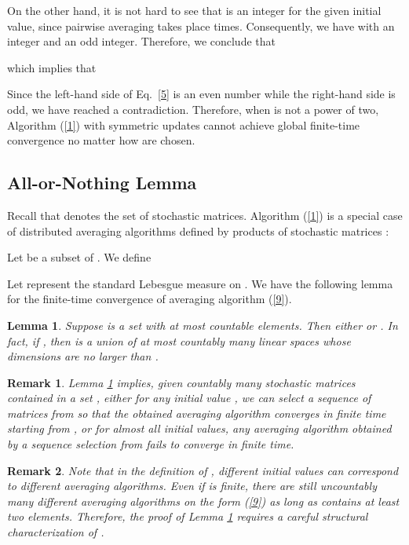 \documentclass[a4paper, 11pt]{article}
\newtheorem{lemma}{Lemma}
\newtheorem{remark}{Remark}
\begin{document}
On the other hand, it is not hard to see that  is an integer for the given initial value, since pairwise averaging takes place   times. Consequently, we have  with  an integer and  an odd integer.
Therefore, we conclude that

which implies that

Since the left-hand side of Eq.~\eqref{5} is an even number while the right-hand side is odd, we have reached a contradiction.  Therefore, when  is not a power of two, Algorithm (\ref{1}) with symmetric updates cannot achieve global finite-time convergence no matter how  are chosen.




\subsection{All-or-Nothing Lemma}

  Recall that   denotes the set of  stochastic matrices.  Algorithm (\ref{1}) is  a special case of distributed averaging algorithms defined by products of stochastic matrices \cite{Tsitsiklis1986,Jadbabaie2003}:

 Let  be a subset of .  We define



Let  represent the standard Lebesgue measure on . We have the following lemma for the finite-time convergence of averaging algorithm (\ref{9}).

\medskip

\begin{lemma}\label{all-or-nothing}
Suppose  is a set with at most countable elements.  Then either  or  . In fact, if , then  is a union of at most countably many linear spaces whose dimensions are no larger than .
\end{lemma}

\medskip

\begin{remark}
Lemma \ref{all-or-nothing} implies, given countably many stochastic matrices contained in a set , either for any initial value , we can select a sequence of matrices from  so that the obtained averaging algorithm converges in finite time starting from , or for almost all initial values, any averaging algorithm obtained by a sequence selection from  fails to converge in finite time.
\end{remark}

\begin{remark} Note that in the definition of , different initial values can correspond to different averaging algorithms.
Even if  is finite, there are still  uncountably many different averaging algorithms on the form (\ref{9}) as long as  contains at least two elements. Therefore, the proof of Lemma \ref{all-or-nothing} requires a careful structural characterization of .
\end{remark}
\end{document}
